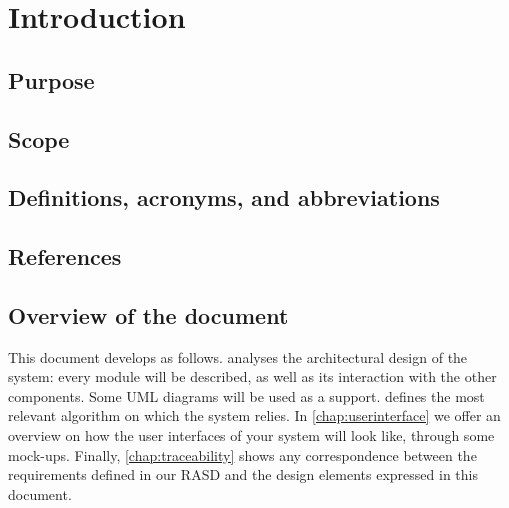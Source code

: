 \chapter{Introduction} \label{chap:introduction}


\section{Purpose}
\lipsum[1]


\section{Scope}
\lipsum[2]


\section{Definitions, acronyms, and abbreviations}
\lipsum[3]

\section{References}
\lipsum[4]


\section{Overview of the document}	
This document develops as follows.  analyses the architectural design of the system: every module will be described, as well as its interaction with the other components. Some UML diagrams will be used as a support.  defines the most relevant algorithm on which the system relies. In \cref{chap:userinterface} we offer an overview on how the user interfaces of your system will look like, through some mock-ups. Finally, \cref{chap:traceability} shows any correspondence between the requirements defined in our RASD and the design elements expressed in this document.


